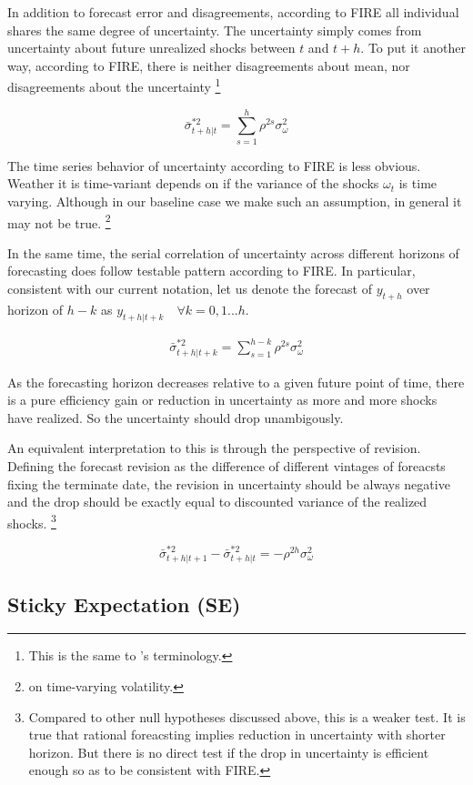 \documentclass[]{article}
\begin{document}
In addition to forecast error and disagreements, according to FIRE all individual shares the same degree of uncertainty. The uncertainty simply comes from uncertainty about future unrealized shocks between $t$ and $t+h$. To put it another way, according to FIRE, there is neither disagreements about mean, nor disagreements about the uncertainty \footnote{This is the same to \citet{}'s terminology.} 

$$\bar \sigma^{*2}_{t+h|t} = \sum^{h}_{s=1}\rho^{2s} \sigma^2_{\omega}$$

The time series behavior of uncertainty according to FIRE is less obvious. Weather it is time-variant depends on if the variance of the shocks $\omega_t$ is time varying. Although in our baseline case we make such an assumption, in general it may not be true. \footnote{\citet{xx} on time-varying volatility.}

In the same time, the serial correlation of uncertainty across different horizons of forecasting does follow testable pattern according to FIRE. In particular, consistent with our current notation, let us denote the forecast of $y_{t+h}$ over horizon of $h-k$ as $y_{t+h|t+k} \quad \forall k =0,1...h$. 

\begin{eqnarray}\label{VarREEq}
\bar \sigma^{*2}_{t+h|t+k} = \sum^{h-k}_{s=1}\rho^{2s} \sigma^2_{\omega}
\end{eqnarray}

As the forecasting horizon decreases relative to a given future point of time, there is a pure efficiency gain or reduction in uncertainty as more and more shocks have realized. So the uncertainty should drop unambigously. 

An equivalent interpretation to this is through the perspective of revision. Defining the forecast revision as the difference of different vintages of foreacsts fixing the terminate date, the revision in uncertainty should be always negative and the drop should be exactly equal to discounted variance of the realized shocks. \footnote{Compared to other null hypotheses discussed above, this is a weaker test. It is true that rational foreacsting implies reduction in uncertainty with shorter horizon. But there is no direct test if the drop in uncertainty is efficient enough so as to be consistent with FIRE. }

$$\bar \sigma^{*2}_{t+h|t+1} - \bar \sigma^{*2}_{t+h|t} = - \rho^{2h}\sigma^2_\omega$$


\subsection{Sticky Expectation (SE)}
\end{document}
